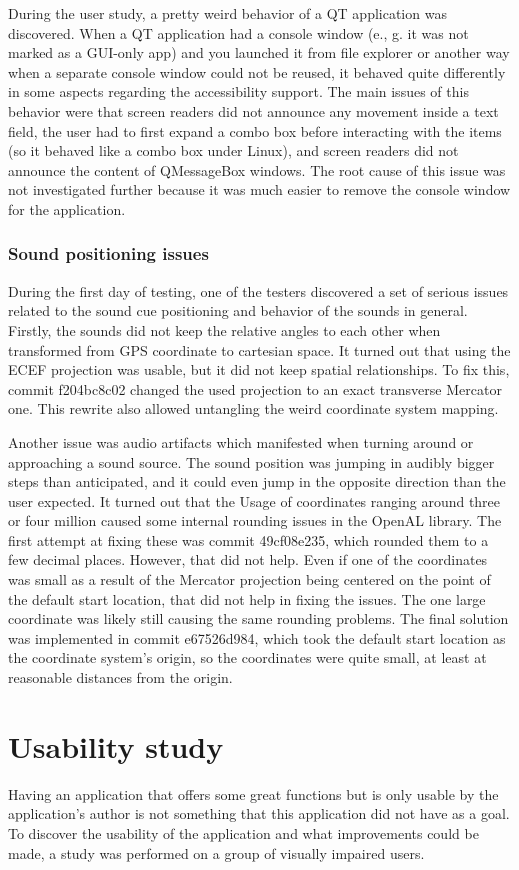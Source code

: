 \documentclass[nolof,digital]{fithesis3}
\begin{document}
During the user study, a pretty weird behavior of a QT application was discovered. When a QT application had a console window (e., g. it was not marked as a GUI-only app) and you launched it from file explorer or another way when a separate console window could not be reused, it behaved quite differently in some aspects regarding the accessibility support. The main issues of this behavior were that screen readers did not announce any movement inside a text field, the user had to first expand a combo box before interacting with the items (so it behaved like a combo box under Linux), and screen readers did not announce the content of QMessageBox windows. The root cause of this issue was not investigated further because it was much easier to remove the console window for the application.
\subsection{Sound positioning issues}
During the first day of testing, one of the testers discovered a set of serious issues related to the sound cue positioning and behavior of the sounds in general. Firstly, the sounds did not keep the relative angles to each other when transformed from GPS coordinate to cartesian space. It turned out that using the ECEF projection was usable, but it did not keep spatial relationships. To fix this, commit f204bc8c02 changed the used projection to an exact transverse Mercator one. This rewrite also allowed untangling the weird coordinate system mapping.

Another issue was audio artifacts which manifested when turning around or approaching a sound source. The sound position was jumping in audibly bigger steps than anticipated, and it could even jump in the opposite direction than the user expected. It turned out that the Usage of coordinates ranging around three or four million caused some internal rounding issues in the OpenAL library. The first attempt at fixing these was commit 49cf08e235, which rounded them to a few decimal places. However, that did not help. Even if one of the coordinates was small as a result of the Mercator projection being centered on the point of the default start location, that did not help in fixing the issues. The one large coordinate was likely still causing the same rounding problems. The final solution was implemented in commit e67526d984, which took the default start location as the coordinate system's origin, so the coordinates were quite small, at least at reasonable distances from the origin.
\chapter{Usability study}
Having an application that offers some great functions but is only usable by the application's author is not something that this application did not have as a goal. To discover the usability of the application and what improvements could be made, a study was performed on a group of visually impaired users.
\end{document}
